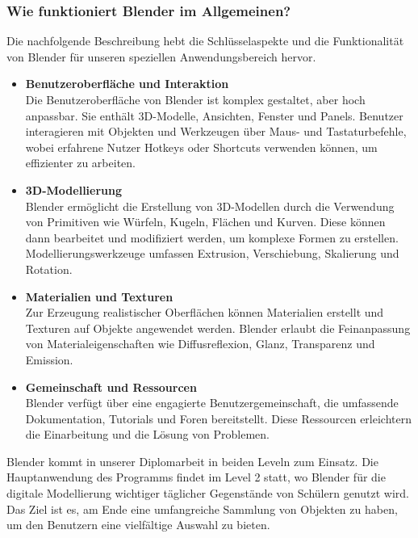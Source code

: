 
\subsubsection{Wie funktioniert Blender im Allgemeinen?}

Die nachfolgende Beschreibung hebt die Schlüsselaspekte und die Funktionalität von Blender für unseren speziellen
Anwendungsbereich hervor.

\begin{itemize}
    \item \textbf{Benutzeroberfläche und Interaktion}\\
    Die Benutzeroberfläche von Blender ist komplex gestaltet, aber hoch anpassbar. Sie enthält 3D-Modelle,
    Ansichten, Fenster und Panels. Benutzer interagieren mit Objekten und Werkzeugen über Maus- und Tastaturbefehle,
    wobei erfahrene Nutzer Hotkeys oder Shortcuts verwenden können, um effizienter zu arbeiten.

    \item \textbf{3D-Modellierung}\\
    Blender ermöglicht die Erstellung von 3D-Modellen durch die Verwendung von Primitiven wie Würfeln, Kugeln,
    Flächen und Kurven. Diese können dann bearbeitet und modifiziert werden, um komplexe Formen zu erstellen.
    Modellierungswerkzeuge umfassen Extrusion, Verschiebung, Skalierung und Rotation.

    \item \textbf{Materialien und Texturen}\\
    Zur Erzeugung realistischer Oberflächen können Materialien erstellt und Texturen auf Objekte angewendet werden.
    Blender erlaubt die Feinanpassung von Materialeigenschaften wie Diffusreflexion, Glanz, Transparenz und Emission.

    \item \textbf{Gemeinschaft und Ressourcen}\\
    Blender verfügt über eine engagierte Benutzergemeinschaft, die umfassende Dokumentation, Tutorials und Foren
    bereitstellt. Diese Ressourcen erleichtern die Einarbeitung und die Lösung von Problemen.

\end{itemize}
Blender kommt in unserer Diplomarbeit in beiden Leveln zum Einsatz. Die Hauptanwendung des Programms findet im Level 2
statt, wo Blender für die digitale Modellierung wichtiger täglicher Gegenstände von Schülern genutzt wird. Das Ziel ist
es, am Ende eine umfangreiche Sammlung von Objekten zu haben, um den Benutzern eine vielfältige Auswahl zu bieten.